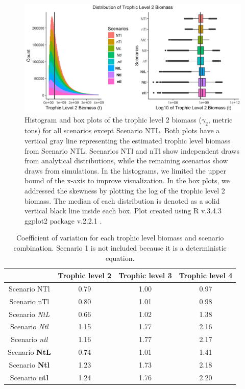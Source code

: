\documentclass[oneside,12pt,final]{sty/ucthesis-CA2012}
\let\cite\citep                             %
\begin{document}
\begin{mainmatter}
\begin{figure}[H]
     \centering
       \includegraphics[width=1\textwidth]{fig/biomass2_hist_box_v3.png}
    \caption{Histogram and box plots of the trophic level 2 biomass ($\gamma_2$, metric tons) for all scenarios except Scenario NTL. Both plots have a vertical gray line representing the estimated trophic level biomass from Scenario NTL. Scenarios NTl and nTl show independent draws from analytical distributions, while the remaining scenarios show draws from simulations. In the histograms, we limited the upper bound of the x-axis to improve visualization. In the box plots, we addressed the skewness by plotting the log of the trophic level 2 biomass. The median of each distribution is denoted as a solid vertical black line inside each box. Plot created using R v.3.4.3 \cite{Rcite} ggplot2 package v.2.2.1 \cite{ggplot}. }
    \label{beta2estimated}
\end{figure}

\begin{table}[ht]
\centering
\caption{Coefficient of variation for each trophic level biomass and scenario combination. Scenario 1 is not included because it is a deterministic equation.}
\begin{tabular}{cccc}
  \hline
 & Trophic level 2 & Trophic level 3 & Trophic level 4 \\ 
  \hline
  Scenario NTl & 0.79 & 1.00 & 0.97 \\ 
  Scenario nTl & 0.80 & 1.01 & 0.98 \\ 
  Scenario \textit{NtL} & 0.66 & 1.02 & 1.38 \\ 
  Scenario \textit{Ntl} & 1.15 & 1.77 & 2.16 \\ 
  Scenario \textit{ntl} & 1.16 & 1.77 & 2.17 \\ 
  Scenario \textbf{NtL} & 0.74 & 1.01 & 1.41 \\ 
  Scenario \textbf{Ntl} & 1.23 & 1.73 & 2.18 \\ 
  Scenario \textbf{ntl} & 1.24 & 1.76 & 2.20 \\ 
   \hline
\end{tabular}
\label{cv}
\end{table}


\end{mainmatter}
\end{document}

